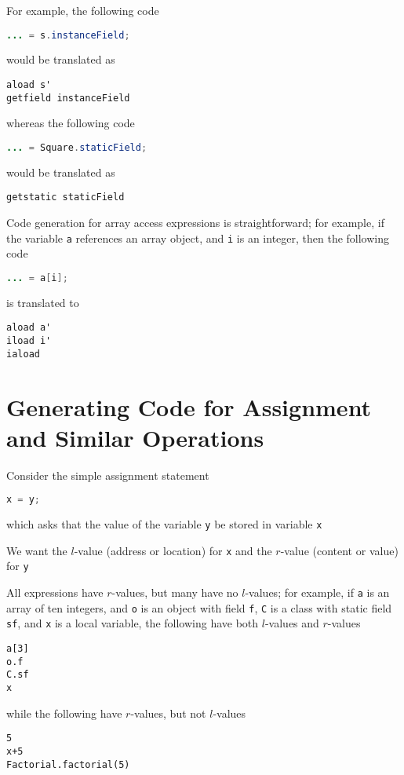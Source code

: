 \documentclass[8pt,a4paper,compress]{beamer}
\begin{document}
\begin{frame}[fragile]
\pause

For example, the following code
\begin{lstlisting}[language=Java]
... = s.instanceField;
\end{lstlisting}
would be translated as
\begin{lstlisting}[language={}]
aload s'
getfield instanceField
\end{lstlisting}

whereas the following code
\begin{lstlisting}[language=Java]
... = Square.staticField;
\end{lstlisting}
would be translated as
\begin{lstlisting}[language={}]
getstatic staticField
\end{lstlisting}

\pause
\bigskip

Code generation for array access expressions is straightforward; for example, if the variable \lstinline{a} references an array object, and \lstinline{i} is an integer, then the following code
\begin{lstlisting}[language=Java]
... = a[i];
\end{lstlisting}
is translated to 
\begin{lstlisting}[language={}]
aload a'
iload i'
iaload
\end{lstlisting}
\end{frame}

\section{Generating Code for Assignment and Similar Operations}
\begin{frame}[fragile]
\pause

Consider the simple assignment statement
\begin{lstlisting}[language=Java]
x = y;
\end{lstlisting}
which asks that the value of the variable \lstinline{y} be stored in variable \lstinline{x}

\pause
\bigskip

We want the $l$-value (address or location) for \lstinline{x} and the $r$-value (content or value) for \lstinline{y}

\pause
\bigskip

All expressions have $r$-values, but many have no $l$-values; for example, if \lstinline{a} is an array of ten integers, and \lstinline{o} is an object with field \lstinline{f}, \lstinline{C} is a class with static field \lstinline{sf}, and \lstinline{x} is a local variable, the following have both $l$-values and $r$-values 
\begin{lstlisting}[language={}]
a[3]
o.f
C.sf
x
\end{lstlisting}
while the following have $r$-values, but not $l$-values
\begin{lstlisting}[language={}]
5
x+5
Factorial.factorial(5)
\end{lstlisting}
\end{frame}
\end{document}
